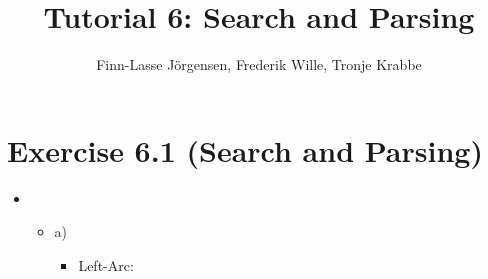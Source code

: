 \documentclass[12pt,a4paper]{article}
\author{Finn-Lasse Jörgensen, Frederik Wille, Tronje Krabbe}
\title{Tutorial 6: Search and Parsing}
\begin{document}
\maketitle


\section*{Exercise 6.1 (Search and Parsing)}
\begin{itemize}
\item
\begin{itemize}
\item{a)}
\begin{itemize}
\item Left-Arc: 
\end{itemize}
\end{itemize}
\end{itemize}
\end{document}

